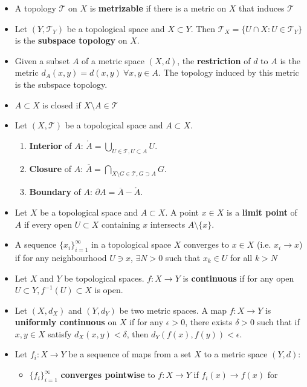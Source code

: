 \documentclass[frenchspacing,9pt,landscape,a4paper]{article}
\theoremstyle{remark}
\begin{document}
\begin{multicols}{4}
\begin{itemize}
        \item A topology  $\mathcal{T}$ on  $X$ is \textbf{metrizable} if there is a metric on  $X$ that induces
            $\mathcal{T}$
    \item Let $(Y,\mathcal{T}_Y)$ be a topological space and $X\subset Y$. Then  $\mathcal{T}_X=\{U\cap
    X:U\in\mathcal{T}_Y\}$ is the \textbf{subspace topology} on $X$.
\item Given a subset $A$ of a metric space  $(X,d)$, the \textbf{restriction} of  $d$ to  $A$ is the metric
     $d_A(x,y)=d(x,y)\ \forall x,y\in A$. The topology induced by this metric is the subspace topology.
 \item $A\subset X$ is closed if  $X\setminus A\in\mathcal{T}$
 \item Let $(X,\mathcal{T})$ be a topological space and  $A\subset X$.
     \begin{enumerate}
         \item \textbf{Interior} of $A$: $\mathring{A}=\bigcup_{U\in\mathcal{T},U\subset A}U$.
         \item \textbf{Closure} of  $A$: $\overline{A}=\bigcap_{X\setminus
             G\in\mathcal{T},G\supset A}G$.
         \item \textbf{Boundary} of  $A$: $\partial A=\overline{A}-\mathring{A}$.
    \end{enumerate}
\item Let $X$ be a topological space and  $A\subset X$. A point  $x\in X$ is a \textbf{limit point} of  $A$
    if every open  $U\subset X$ containing  $x$ intersects  $A\setminus\{x\}$.
\item A sequence $\{x_i\}_{i=1}^\infty$ in a topological space $X$ converges to
     $x\in X$ (i.e. $x_i\to x$) if for any neighbourhood  $U\ni x$,  $\exists N>0$ such that  $x_k\in U$ for all 
     $k>N$
 \item Let $X$ and  $Y$ be topological spaces. $f:X\to Y$ is \textbf{continuous} if for any open
    $U\subset Y,f^{-1}(U)\subset X$ is open.
\item Let $(X,d_X)$ and  $(Y,d_Y)$ be two metric spaces. A map  $f:X\to Y$ is \textbf{uniformly continuous}
    on  $X$ if for any  $\epsilon>0$, there exists  $\delta>0$ such that if  $x,y\in X$ satisfy
    $d_X(x,y)<\delta$, then  $d_Y(f(x),f(y))<\epsilon$.
\item Let $f_i:X\to Y$ be a sequence of maps from a set  $X$ to a metric space  $(Y,d)$:
     \begin{itemize}
         \item $\{f_i\}_{i=1}^\infty$ \textbf{converges pointwise} to  $f:X\to Y$ if  $f_i(x)\to f(x)$ for

\end{itemize}
\end{itemize}
\end{multicols}
\end{document}
